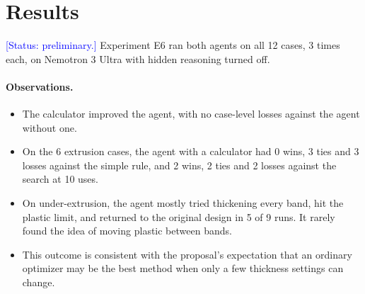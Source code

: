 \documentclass[11pt]{article}
\newcommand{\status}[1]{\textcolor{blue}{[Status: #1]}}
\begin{document}
\section{Results}
\status{preliminary.}
Experiment E6 ran both agents on all 12 cases, 3 times each, on Nemotron 3 Ultra with hidden reasoning turned off.

\begin{table}[h]
\centering

\caption{Average distance from a healthy part, lower is better. Only the 6 extrusion cases separate the methods, because the score barely registers layer shift and warpage. Search and rule results are deterministic; agent values average 3 runs per case.}
\end{table}

\begin{table}[h]
\centering

\caption{Stiffness as a percentage of a healthy part, target 100\%. The number in each case name is the height where the defect starts.}
\end{table}

\paragraph{Observations.}
\begin{itemize}
  \item The calculator improved the agent, with no case-level losses against the agent without one.
  \item On the 6 extrusion cases, the agent with a calculator had 0 wins, 3 ties and 3 losses against the simple rule, and 2 wins, 2 ties and 2 losses against the search at 10 uses.
  \item On under-extrusion, the agent mostly tried thickening every band, hit the plastic limit, and returned to the original design in 5 of 9 runs. It rarely found the idea of moving plastic between bands.
  \item This outcome is consistent with the proposal's expectation that an ordinary optimizer may be the best method when only a few thickness settings can change.
\end{itemize}
\end{document}
